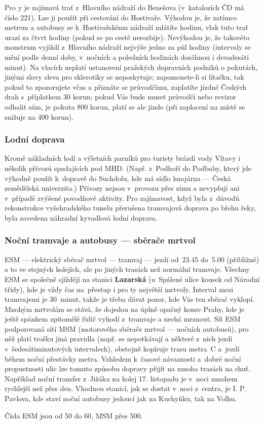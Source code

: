 Pro \mfk{}y je zajímavá trať z~Hlavního nádraží do Benešova
(v~katalozích ČD má číslo 221). Lze ji použít při cestování do
Hostivaře. Výhodou je, že zatímco metrem a autobusy se
k~Hostivařskému nádraží mlátíte hodinu, vlak tuto trať urazí za
čtvrt hodiny (pokud se po cestě nerozbije). Nevýhodou je, že
takovéto monstrum vyjíždí z~Hlavního nádraží nejvýše jedno za půl
hodiny (intervaly se mění podle denní doby, v~nočních a poledních
hodinách dosáhnou i devadesáti minut). Na vlacích neplatí
ustanovení pražských dopravních podniků o pokutách, jinými slovy
sleva pro sklerotiky se neposkytuje; zapomenete-li si lítačku, tak
pokud to zpozorujete včas a přiznáte se průvodčímu, zaplatíte
jízdné Českých drah s~příplatkem 30 korun; pokud Vás bude muset
průvodčí nebo revizor odhalit sám, je pokuta 800 korun, platí se
ale jinde (při zaplacení na místě se snižuje na 400 korun).

\subsubsection{Lodní doprava}

Kromě nákladních lodí a výletních parníků pro turisty brázdí vody
Vltavy i několik přívozů spadajících pod MHD. (Např. z~Podhoří do
Podbaby, který jde výhodně použít k~dopravě do Suchdolu, kde má
sídlo hnojárna --- Česká zemědělská univerzita.) Přívozy nejsou
v~provozu přes zimu a nevyplují ani v~případě zvýšené povodňové
aktivity. Pro zajímavost, když byla z~důvodů rekonstrukce
vyšehradského tunelu přerušena tramvajová doprava po břehu řeky,
byla zavedena náhradní kyvadlová lodní doprava.

\subsubsection{Noční tramvaje a autobusy --- sběrače mrtvol}

ESM --- elektrický sběrač mrtvol --- tramvaj --- jezdí od~23.45
do~5.00 (přibližně) a to ve stejných kolejích, ale po jiných
trasách než normální tramvaje. Všechny ESM se společně sjíždějí na
stanici {\bf Lazarská} (u~Spálené ulice kousek od Národní třídy),
kde je vždy čas na~přestup i pro ty největší mrtvoly. Interval
mezi tramvajemi je 30~minut, takže je třeba dávat pozor, kde Vás
ten sběrač vyklopí. Mnohým mrtvolám se stává, že dojedou na úplně
opačný konec Prahy, kde je ještě spánkem zpitomělé řidič vyhodí
z~tramvaje a nechá mrznout. Síť ESM podporovaná sítí MSM
(motorového sběrače mrtvol --- nočních autobusů), pro něž platí
trošku jiná pravidla (např.  se nepotkávají a některé z~nich jezdí
v~šedesátiminutových intervalech), obstojně kopíruje trasu metra~C
a~jezdí během noční přestávky metra. Vzhledem k~časové návaznosti
a~dobré noční propustnosti ulic lze tomuto způsobu dopravy přijít
na mnoha trasách na chuť. Například noční transfer z~Jižáku na
kolej 17. listopadu je v~noci mnohem rychlejší než přes den.
Vhodnou stanicí, jak se dostat v~noci z~centra, je I. P. Pavlova,
kde staví noční autobusy jedoucí jak na Kuchyňku, tak na Volhu.

Čísla ESM jsou od 50 do 60, MSM přes 500.